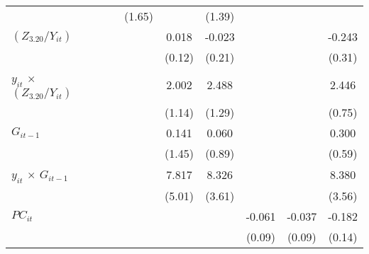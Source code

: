 \documentclass[12pt, a4paper]{article}
\begin{document}
\begin{table}[htbp]
\begin{threeparttable}
{\begin{tabular}{l*{9}{c}}
				&                     &                     &                     &      (1.65)         &                     &      (1.39)         &                     &                     &                     \\
				$(Z_{3.20}/Y_{it})$          &                     &                     &                     &                     &       0.018         &      -0.023         &                     &                     &      -0.243         \\
				&                     &                     &                     &                     &      (0.12)         &      (0.21)         &                     &                     &      (0.31)         \\
				$y_{it}$ $\times$ $(Z_{3.20}/Y_{it})$&                     &                     &                     &                     &       2.002         &       2.488         &                     &                     &       2.446\sym{**} \\
				&                     &                     &                     &                     &      (1.14)         &      (1.29)         &                     &                     &      (0.75)         \\
				$G_{it-1}$           &                     &                     &                     &                     &       0.141         &       0.060         &                     &                     &       0.300         \\
				&                     &                     &                     &                     &      (1.45)         &      (0.89)         &                     &                     &      (0.59)         \\
				$y_{it}$ $\times$ $G_{it-1}$&                     &                     &                     &                     &       7.817         &       8.326\sym{*}  &                     &                     &       8.380\sym{*}  \\
				&                     &                     &                     &                     &      (5.01)         &      (3.61)         &                     &                     &      (3.56)         \\
				$PC_{it}$              &                     &                     &                     &                     &                     &                     &      -0.061         &      -0.037         &      -0.182         \\
				&                     &                     &                     &                     &                     &                     &      (0.09)         &      (0.09)         &      (0.14)         \\

\end{tabular}}
\end{threeparttable}
\end{table}
\end{document}

